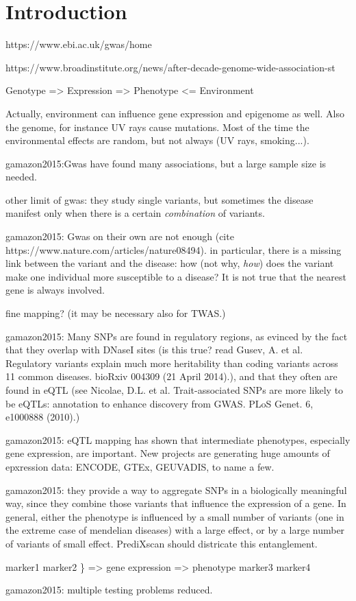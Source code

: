 \documentclass[../main.tex]{subfiles}
\begin{document}
\chapter{Introduction}

https://www.ebi.ac.uk/gwas/home

https://www.broadinstitute.org/news/after-decade-genome-wide-association-st

Genotype => Expression => Phenotype <= Environment

Actually, environment can influence gene expression and epigenome as 
well. Also the genome, for instance UV rays cause mutations. Most of the 
time the environmental effects are random, but not always (\eg UV rays, 
smoking...).

gamazon2015:Gwas have found many associations, but a large sample size 
is needed.

other limit of gwas: they study single variants, but sometimes the 
disease manifest only when there is a certain \textit{combination} of 
variants.

gamazon2015: Gwas on their own are not enough (cite 
https://www.nature.com/articles/nature08494). in particular, there is a 
missing link between the variant and the disease: how (not why, 
\textit{how}) does the variant make one individual more susceptible to a 
disease? It is not true that the nearest gene is always involved.

fine mapping? (it may be necessary also for TWAS.)

gamazon2015: Many SNPs are found in regulatory regions, as evinced by 
the fact that they overlap with DNaseI sites (is this true? read Gusev, 
A. et al. Regulatory variants explain much more heritability than coding 
variants across 11 common diseases. bioRxiv 004309 (21 April 2014).), 
and that they often are found in eQTL (see Nicolae, D.L. et al. 
Trait-associated SNPs are more likely to be eQTLs: annotation to enhance 
discovery from GWAS. PLoS Genet. 6, e1000888 (2010).)

gamazon2015: eQTL mapping has shown that intermediate phenotypes, 
especially gene expression, are important. New projects are generating 
huge amounts of epxression data: ENCODE, GTEx, GEUVADIS, to name a few.

gamazon2015: they provide a way to aggregate SNPs in a biologically 
meaningful way, since they combine those variants that influence the 
expression of a gene. In general, either the phenotype is influenced by 
a small number of variants (one in the extreme case of mendelian 
diseases) with a large effect, or by a large number of variants of small 
effect. PrediXscan should districate this entanglement.

marker1
marker2
			\} => gene expression => phenotype
marker3
marker4

gamazon2015: multiple testing problems reduced.
\end{document}

